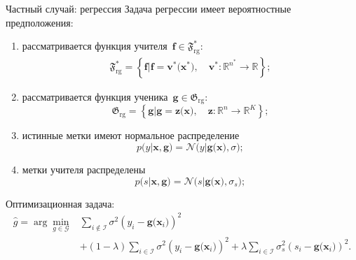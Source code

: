 \documentclass[9pt,pdf,hyperref={unicode}]{beamer}
\begin{document}
\begin{frame}{Частный случай: регрессия}
\justifying
Задача регрессии имеет вероятностные предположения:
\begin{enumerate}
	\item рассматривается функция учителя~$\mathbf{f}\in\mathfrak{F}_{\text{rg}}^{*}$:
	\[
	\begin{aligned}
	\mathfrak{F}_{\text{rg}}^* = \left\{\mathbf{f}| \mathbf{f} = \mathbf{v}^*\bigr(\mathbf{x}^*\bigr), \quad \mathbf{v}^*: \mathbb{R}^{n^*} \to \mathbb{R} \right\};
	\end{aligned}
	\]
	\item рассматривается функция ученика~$\mathbf{g}\in\mathfrak{G}_{\text{rg}}$:
\[
\mathfrak{G}_{\text{rg}} = \left\{\mathbf{g}| \mathbf{g} = \mathbf{z}\bigr(\mathbf{x}\bigr), \quad \mathbf{z}: \mathbb{R}^n \to \mathbb{R}^K \right\};
\]
	\item истинные метки имеют нормальное распределение
	\[
		p\bigr(y|\mathbf{x}, \mathbf{g}\bigr) = \mathcal{N}\bigr(y|\mathbf{g}\bigr(\mathbf{x}\bigr), \sigma\bigr);
	\]
	\item метки учителя распределены
	\[
		p\bigr(s| \mathbf{x}, \mathbf{g}\bigr) = \mathcal{N}\bigr(s|\mathbf{g}\bigr(\mathbf{x}\bigr), \sigma_s\bigr);
	\]
\end{enumerate}
Оптимизационная задача:
\[
\begin{aligned}
\hat{g} = \arg\min_{g\in \mathcal{G}} & \sum_{i\not\in \mathcal{I}}\sigma^2\left(y_i-\mathbf{g}\bigr(\mathbf{x}_i\bigr)\right)^2 \\
&+ \left(1-\lambda\right)\sum_{i\in \mathcal{I}}\sigma^2\left(y_i-\mathbf{g}\bigr(\mathbf{x}_i\bigr)\right)^2 + \lambda\sum_{i\in \mathcal{I}}\sigma_s^2\left(s_i-\mathbf{g}\bigr(\mathbf{x}_i\bigr)\right)^2.
\end{aligned}
\]
\end{frame}
\end{document}
